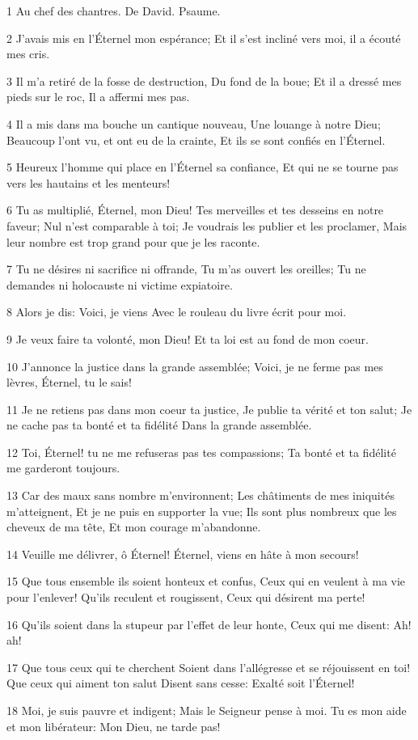\par 1 Au chef des chantres. De David. Psaume.
\par 2 J'avais mis en l'Éternel mon espérance; Et il s'est incliné vers moi, il a écouté mes cris.
\par 3 Il m'a retiré de la fosse de destruction, Du fond de la boue; Et il a dressé mes pieds sur le roc, Il a affermi mes pas.
\par 4 Il a mis dans ma bouche un cantique nouveau, Une louange à notre Dieu; Beaucoup l'ont vu, et ont eu de la crainte, Et ils se sont confiés en l'Éternel.
\par 5 Heureux l'homme qui place en l'Éternel sa confiance, Et qui ne se tourne pas vers les hautains et les menteurs!
\par 6 Tu as multiplié, Éternel, mon Dieu! Tes merveilles et tes desseins en notre faveur; Nul n'est comparable à toi; Je voudrais les publier et les proclamer, Mais leur nombre est trop grand pour que je les raconte.
\par 7 Tu ne désires ni sacrifice ni offrande, Tu m'as ouvert les oreilles; Tu ne demandes ni holocauste ni victime expiatoire.
\par 8 Alors je dis: Voici, je viens Avec le rouleau du livre écrit pour moi.
\par 9 Je veux faire ta volonté, mon Dieu! Et ta loi est au fond de mon coeur.
\par 10 J'annonce la justice dans la grande assemblée; Voici, je ne ferme pas mes lèvres, Éternel, tu le sais!
\par 11 Je ne retiens pas dans mon coeur ta justice, Je publie ta vérité et ton salut; Je ne cache pas ta bonté et ta fidélité Dans la grande assemblée.
\par 12 Toi, Éternel! tu ne me refuseras pas tes compassions; Ta bonté et ta fidélité me garderont toujours.
\par 13 Car des maux sans nombre m'environnent; Les châtiments de mes iniquités m'atteignent, Et je ne puis en supporter la vue; Ils sont plus nombreux que les cheveux de ma tête, Et mon courage m'abandonne.
\par 14 Veuille me délivrer, ô Éternel! Éternel, viens en hâte à mon secours!
\par 15 Que tous ensemble ils soient honteux et confus, Ceux qui en veulent à ma vie pour l'enlever! Qu'ils reculent et rougissent, Ceux qui désirent ma perte!
\par 16 Qu'ils soient dans la stupeur par l'effet de leur honte, Ceux qui me disent: Ah! ah!
\par 17 Que tous ceux qui te cherchent Soient dans l'allégresse et se réjouissent en toi! Que ceux qui aiment ton salut Disent sans cesse: Exalté soit l'Éternel!
\par 18 Moi, je suis pauvre et indigent; Mais le Seigneur pense à moi. Tu es mon aide et mon libérateur: Mon Dieu, ne tarde pas!

